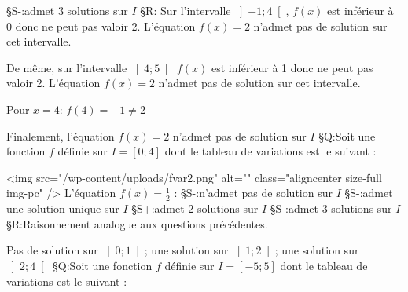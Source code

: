 §S-:admet 3 solutions sur $I$
§R: Sur l'intervalle $\left]-1; 4\right[$, $f\left(x\right)$ est inférieur à 0 donc ne peut pas valoir 2. L'équation $f\left(x\right)=2$ n'admet pas de solution sur cet intervalle.
\par
De même, sur l'intervalle $\left]4 ; 5\right[$ $f\left(x\right)$ est inférieur à 1 donc ne peut pas valoir 2. L'équation $f\left(x\right)=2$ n'admet pas de solution sur cet intervalle.
\par
Pour $x=4$: $f\left(4\right)=-1\neq 2$
\par
Finalement, l'équation $f\left(x\right)=2$ n'admet pas de solution sur $I$
§Q:Soit une fonction $f$ définie sur $I=\left[0; 4\right]$ dont le tableau de variations est le suivant :

<img src="/wp-content/uploads/fvar2.png" alt="" class="aligncenter size-full  img-pc" />
L'équation $f\left(x\right)=\frac{1}{2}$ :
§S-:n'admet pas de solution sur $I$
§S-:admet une solution unique sur $I$
§S+:admet 2 solutions sur $I$
§S-:admet 3 solutions sur $I$
§R:Raisonnement analogue aux questions précédentes.
\par
Pas de solution sur $\left]0;1\right[$; une solution sur $\left]1;2\right[$; une solution sur $\left]2;4\right[$
§Q:Soit une fonction $f$ définie sur $I=\left[-5; 5\right]$ dont le tableau de variations est le suivant :
\begin{center}
 \begin{extern}%
   \end{extern}
\end{center}
